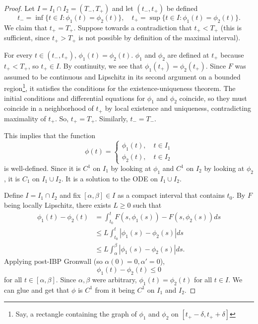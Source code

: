 \documentclass{tufte-handout}
\theoremstyle{definition}
\begin{document}
\begin{proof}
	Let $I = I_1 \cap I_2 = (T_-, T_+)$ and let $(t_-,t_+)$ be defined \[
		t_- = \inf \{t \in I : \phi_1(t) = \phi_2(t)\}, \quad t_+ = \sup \{t \in I : \phi_1(t) = \phi_2(t)\}
	.\]  We claim that $t_+ = T_+$. Suppose towards a contradiction that $t_+ < T_+$ (this is sufficient, since $t_+ > T_+$ is not possible by definition of the maximal interval).

	For every $t \in (t_-, t_+)$, $\phi_1(t) = \phi_2(t)$. $\phi_1$ and $\phi_2$ are defined at $t_+$ because $t_+ < T_+$, so $t_+ \in I$. By continuity, we see that $\phi_1(t_+) = \phi_2(t_+)$. Since $F$ was assumed to be continuous and Lipschitz in its second argument on a bounded region\footnote{Say, a rectangle containing the graph of $\phi_1$ and $\phi_2$ on $[t_+ - \delta, t_+ + \delta]$}, it satisfies the conditions for the existence-uniqueness theorem. The initial conditions and differential equations for $\phi_1$ and $\phi_2$ coincide, so they must coincide in a neighborhood of $t_+$ by local existence and uniqueness, contradicting maximality of $t_+$. So, $t_+ = T_+$. Similarly, $t_- = T_-$.

	This implies that the function \[
		\phi(t) = \begin{cases}
			\phi_1(t), \quad t \in I_1 \\
			\phi_2(t), \quad t \in I_2
		\end{cases}
	\] is well-defined. Since it is $C^1$ on $I_1$ by looking at $\phi_1$ and $C^1$ on $I_2$ by looking at $\phi_2$, it is $C_1$ on $I_1 \cup I_2$. It is a solution to the ODE on $I_1 \cup I_2$.

	Define $I = I_1 \cap I_2$ and fix $\left[ \alpha,\beta \right] \in I$ as a compact interval that contains $t_0$. By $F$ being locally Lipschitz, there exists $L \ge 0$ such that 
	\begin{align*}
		\phi_1(t) - \phi_2(t) &= \int_{t_0}^{t} F(s,\phi_1(s)) - F(s, \phi_2(s)) ds \\
							  &\le L \int_{t_0}^{t} \left| \phi_1(s) - \phi_2(s) \right|ds \\
							  &\le L \int_{\alpha}^{\beta} \left| \phi_1(s) - \phi_2(s) \right|ds 
	.\end{align*}
	Applying post-IBP Gronwall (so $\alpha(0) = 0, \alpha' = 0$), \[
		\phi_1(t) - \phi_2(t) \le 0
	\] for all $t \in [\alpha,\beta]$. Since $\alpha, \beta$ were arbitrary, $\phi_1(t) = \phi_2(t)$ for all $t \in I$. We can glue and get that $\phi$ is $C^1$ from it being $C^1$ on $I_1$ and $I_2$.


\end{proof}
\end{document}
